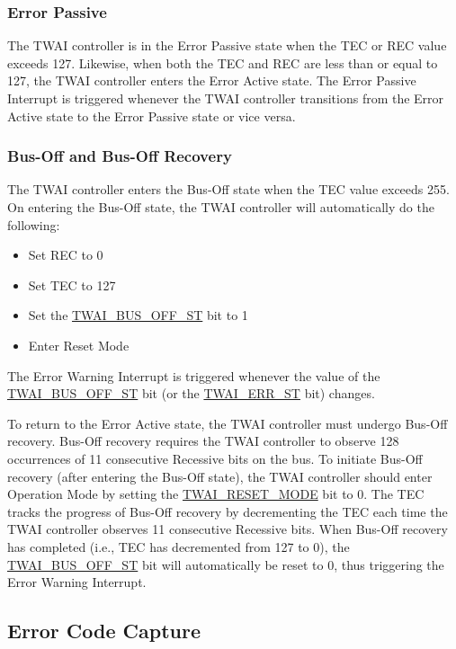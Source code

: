 \documentclass[main\_\_EN.tex]{subfiles}
\begin{document}
\subsubsection{Error Passive}

The TWAI controller is in the Error Passive state when the TEC or REC value exceeds 127. Likewise, when both the TEC and REC are less than or equal to 127, the TWAI controller enters the Error Active state. The Error Passive Interrupt is triggered whenever the TWAI controller transitions from the Error Active state to the Error Passive state or vice versa.

\subsubsection{Bus-Off and Bus-Off Recovery}

The TWAI controller enters the Bus-Off state when the TEC value exceeds 255. On entering the Bus-Off state, the TWAI controller will automatically do the following:

\begin{itemize}
    \item Set REC to 0
    \item Set TEC to 127
    \item Set the \hyperref[fielddesc:TWAIBUSOFFST]{TWAI\_BUS\_OFF\_ST} bit to 1
    \item Enter Reset Mode
\end{itemize}

The Error Warning Interrupt is triggered whenever the value of the \hyperref[fielddesc:TWAIBUSOFFST]{TWAI\_BUS\_OFF\_ST} bit (or the \hyperref[fielddesc:TWAIERRST]{TWAI\_ERR\_ST} bit) changes.

To return to the Error Active state, the TWAI controller must undergo Bus-Off recovery. Bus-Off recovery requires the TWAI controller to observe 128 occurrences of 11 consecutive Recessive bits on the bus. To initiate Bus-Off recovery (after entering the Bus-Off state), the TWAI controller should enter Operation Mode by setting the \hyperref[fielddesc:TWAIRESETMODE]{TWAI\_RESET\_MODE} bit to 0.
The TEC tracks the progress of Bus-Off recovery by decrementing the TEC each time the TWAI controller observes 11 consecutive Recessive bits. When Bus-Off recovery has completed (i.e., TEC has decremented from 127 to 0), the \hyperref[fielddesc:TWAIBUSOFFST]{TWAI\_BUS\_OFF\_ST} bit will automatically be reset to 0, thus triggering the Error Warning Interrupt.

\subsection{Error Code Capture}
\end{document}

